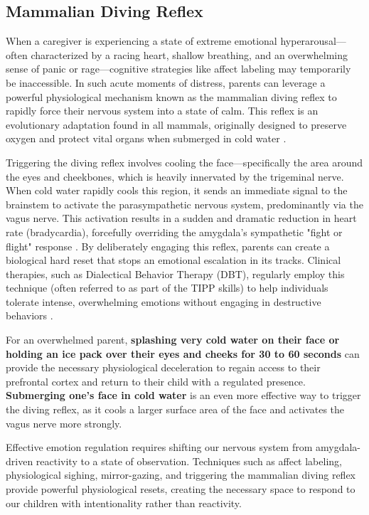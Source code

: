 \subsection{Mammalian Diving Reflex}

When a caregiver is experiencing a state of extreme emotional hyperarousal---often characterized by a racing heart, shallow breathing, and an overwhelming sense of panic or rage---cognitive strategies like affect labeling may temporarily be inaccessible.
In such acute moments of distress, parents can leverage a powerful physiological mechanism known as the mammalian diving reflex to rapidly force their nervous system into a state of calm.
This reflex is an evolutionary adaptation found in all mammals, originally designed to preserve oxygen and protect vital organs when submerged in cold water \citep{panneton2013}.

Triggering the diving reflex involves cooling the face---specifically the area around the eyes and cheekbones, which is heavily innervated by the trigeminal nerve.
When cold water rapidly cools this region, it sends an immediate signal to the brainstem to activate the parasympathetic nervous system, predominantly via the vagus nerve.
This activation results in a sudden and dramatic reduction in heart rate (bradycardia), forcefully overriding the amygdala's sympathetic "fight or flight" response \citep{panneton2013}.
By deliberately engaging this reflex, parents can create a biological hard reset that stops an emotional escalation in its tracks.
Clinical therapies, such as Dialectical Behavior Therapy (DBT), regularly employ this technique (often referred to as part of the TIPP skills) to help individuals tolerate intense, overwhelming emotions without engaging in destructive behaviors \citep{linehan2014}.

For an overwhelmed parent, \textbf{splashing very cold water on their face or holding an ice pack over their eyes and cheeks for 30 to 60 seconds} can provide the necessary physiological deceleration to regain access to their prefrontal cortex and return to their child with a regulated presence.
\textbf{Submerging one's face in cold water} is an even more effective way to trigger the diving reflex, as it cools a larger surface area of the face and activates the vagus nerve more strongly.

\begin{keyinsight}
Effective emotion regulation requires shifting our nervous system from amygdala-driven reactivity to a state of observation. 
Techniques such as affect labeling, physiological sighing, mirror-gazing, and triggering the mammalian diving reflex provide powerful physiological resets, creating the necessary space to respond to our children with intentionality rather than reactivity.
\end{keyinsight}

